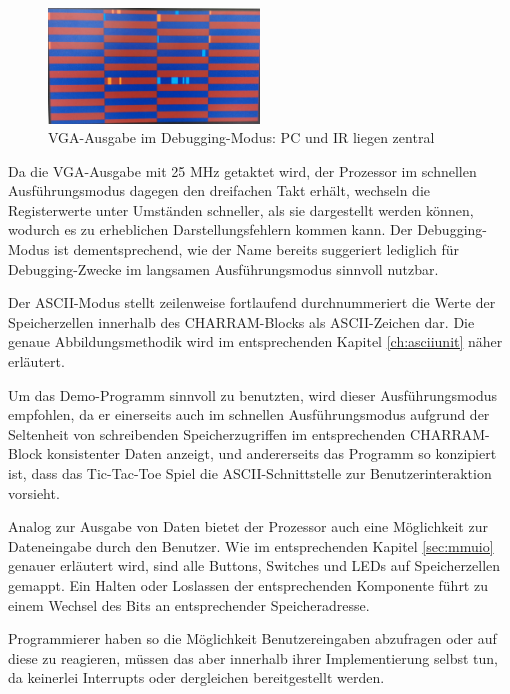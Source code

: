 \begin{figure}[H]
	\centering
	\label{fig:debuggingui}
		\includegraphics[width=0.5\textwidth]{debugui.png}
	\caption[VGA-Ausgabe im Debugging-Modus]{VGA-Ausgabe im Debugging-Modus: PC und IR liegen zentral}
\end{figure}

Da die VGA-Ausgabe mit 25 MHz getaktet wird, der Prozessor im schnellen Ausf\"uhrungsmodus dagegen den dreifachen Takt erh\"alt, wechseln die Registerwerte unter Umst\"anden schneller, als sie dargestellt werden k\"onnen, wodurch es zu erheblichen Darstellungsfehlern kommen kann. Der Debugging-Modus ist dementsprechend, wie der Name bereits suggeriert lediglich f\"ur Debugging-Zwecke im langsamen Ausf\"uhrungsmodus sinnvoll nutzbar.

Der ASCII-Modus stellt zeilenweise fortlaufend durchnummeriert die Werte der Speicherzellen innerhalb des CHAR\-RAM-Blocks als ASCII-Zeichen dar. Die genaue Abbildungsmethodik wird im entsprechenden Kapitel \ref{ch:asciiunit} n\"aher erl\"autert.

Um das Demo-Programm sinnvoll zu benutzten, wird dieser Ausf\"uhrungsmodus empfohlen, da er einerseits auch im schnellen Ausf\"uhrungsmodus aufgrund der Seltenheit von schreibenden Speicherzugriffen im entsprechenden CHAR\-RAM-Block konsistenter Daten anzeigt, und andererseits das Programm so konzipiert ist, dass das Tic-Tac-Toe Spiel die ASCII-Schnittstelle zur Benutzerinteraktion vorsieht.


Analog zur Ausgabe von Daten bietet der Prozessor auch eine M\"oglichkeit zur Dateneingabe durch den Benutzer. Wie im entsprechenden Kapitel \ref{sec:mmuio} genauer erl\"autert wird, sind alle Buttons, Switches und LEDs auf Speicherzellen gemappt. Ein Halten oder Loslassen der entsprechenden Komponente f\"uhrt zu einem Wechsel des Bits an entsprechender Speicheradresse.

Programmierer haben so die M\"oglichkeit Benutzereingaben abzufragen oder auf diese zu reagieren, m\"ussen das aber innerhalb ihrer Implementierung selbst tun, da keinerlei Interrupts oder dergleichen bereitgestellt werden.


